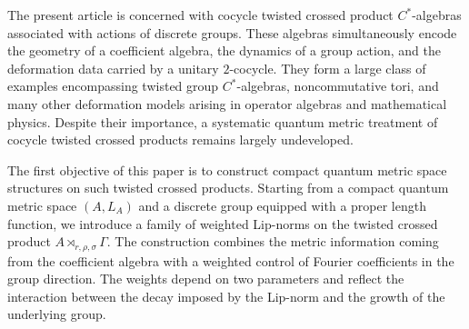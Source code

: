 \documentclass[a4paper,11pt,reqno]{amsart}
\theoremstyle{plain}
\theoremstyle{mainthmstyle}
\theoremstyle{named}
\numberwithin{equation}{section}
\begin{document}
The present article is concerned with cocycle twisted crossed product $C^{\ast}$-algebras associated with actions of discrete groups. These algebras simultaneously encode the geometry of a coefficient algebra, the dynamics of a group action, and the deformation data carried by a unitary $2$-cocycle. They form a large class of examples encompassing twisted group $C^{\ast}$-algebras, noncommutative tori, and many other deformation models arising in operator algebras and mathematical physics. Despite their importance, a systematic quantum metric treatment of cocycle twisted crossed products remains largely undeveloped.

The first objective of this paper is to construct compact quantum metric space structures on such twisted crossed products. Starting from a compact quantum metric space $(A,L_A)$ and a discrete group equipped with a proper length function, we introduce a family of weighted Lip-norms on the twisted crossed product $A\rtimes_{r,\rho,\sigma}\Gamma$. The construction combines the metric information coming from the coefficient algebra with a weighted control of Fourier coefficients in the group direction. The weights depend on two parameters and reflect the interaction between the decay imposed by the Lip-norm and the growth of the underlying group. 
\end{document}
